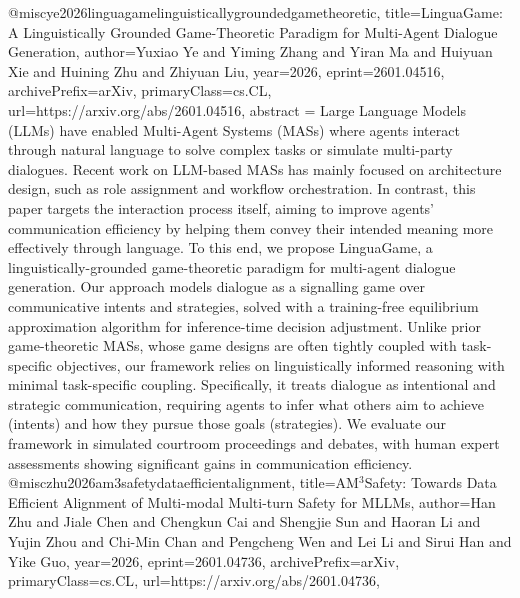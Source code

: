 {}@misc{ye2026linguagamelinguisticallygroundedgametheoretic,
      title={LinguaGame: A Linguistically Grounded Game-Theoretic Paradigm for Multi-Agent Dialogue Generation}, 
      author={Yuxiao Ye and Yiming Zhang and Yiran Ma and Huiyuan Xie and Huining Zhu and Zhiyuan Liu},
      year={2026},
      eprint={2601.04516},
      archivePrefix={arXiv},
      primaryClass={cs.CL},
      url={https://arxiv.org/abs/2601.04516},
      abstract = {Large Language Models (LLMs) have enabled Multi-Agent Systems (MASs) where agents interact through natural language to solve complex tasks or simulate multi-party dialogues. Recent work on LLM-based MASs has mainly focused on architecture design, such as role assignment and workflow orchestration. In contrast, this paper targets the interaction process itself, aiming to improve agents' communication efficiency by helping them convey their intended meaning more effectively through language. To this end, we propose LinguaGame, a linguistically-grounded game-theoretic paradigm for multi-agent dialogue generation. Our approach models dialogue as a signalling game over communicative intents and strategies, solved with a training-free equilibrium approximation algorithm for inference-time decision adjustment. Unlike prior game-theoretic MASs, whose game designs are often tightly coupled with task-specific objectives, our framework relies on linguistically informed reasoning with minimal task-specific coupling. Specifically, it treats dialogue as intentional and strategic communication, requiring agents to infer what others aim to achieve (intents) and how they pursue those goals (strategies). We evaluate our framework in simulated courtroom proceedings and debates, with human expert assessments showing significant gains in communication efficiency.}
}@misc{zhu2026am3safetydataefficientalignment,
      title={AM$^3$Safety: Towards Data Efficient Alignment of Multi-modal Multi-turn Safety for MLLMs}, 
      author={Han Zhu and Jiale Chen and Chengkun Cai and Shengjie Sun and Haoran Li and Yujin Zhou and Chi-Min Chan and Pengcheng Wen and Lei Li and Sirui Han and Yike Guo},
      year={2026},
      eprint={2601.04736},
      archivePrefix={arXiv},
      primaryClass={cs.CL},
      url={https://arxiv.org/abs/2601.04736},
}
